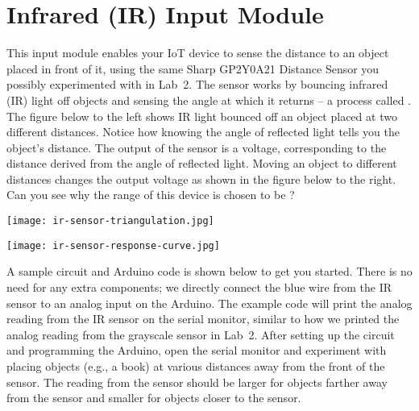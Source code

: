 
\clearpage
\section{Infrared (IR) Input Module}
\label{sec-input-ir}

This input module enables your IoT device to sense the distance to an
object placed  in front of it, using the same Sharp
GP2Y0A21 Distance Sensor you possibly experimented with in Lab~2. The
sensor works by bouncing infrared (IR) light off objects and sensing the
angle at which it returns -- a process called . The
figure below to the left shows IR light bounced off an object placed at
two different distances. Notice how knowing the angle of reflected
light tells you the object's distance. The output of the sensor is a
voltage, corresponding to the distance derived from the angle of
reflected light. Moving an object to different distances changes the
output voltage as shown in the figure below to the right. Can you see
why the range of this device is chosen to be ?

\vspace{0.1in}
\begin{minipage}[t]{0.49\tw}
  \texttt{[image: ir-sensor-triangulation.jpg]}
\end{minipage}
\hfill
\begin{minipage}[t]{0.49\tw}
  \texttt{[image: ir-sensor-response-curve.jpg]}
\end{minipage}
\vspace{0.1in}

A sample circuit and Arduino code is shown below to get you started.
There is no need for any extra components; we directly connect the blue
wire from the IR sensor to an analog input on the Arduino. The example
code will print the analog reading from the IR sensor on the serial
monitor, similar to how we printed the analog reading from the grayscale
sensor in Lab~2. After setting up the circuit and programming the
Arduino, open the serial monitor and experiment with placing objects
(e.g., a book) at various distances away from the front of the sensor.
The reading from the sensor should be larger for objects farther away
from the sensor and smaller for objects closer to the sensor.

